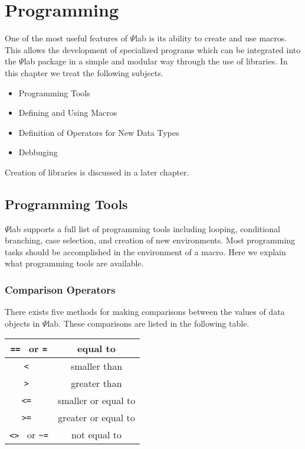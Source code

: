 \chapter{Programming}
\label{ch4}

	One of the most useful features of $\Psi$lab is its ability
to create and use macros.  This allows the development of specialized
programs which can be integrated into the $\Psi$lab package in a simple and
modular way through the use of libraries.  In this chapter we 
treat the following subjects.
\begin{itemize}
	\item Programming Tools
	\item Defining and Using Macros
        \item Definition of Operators for New Data Types
	\item{Debbuging}
\end{itemize}	
Creation of libraries is discussed in a later chapter.

\section{Programming Tools}

	$\Psi$lab supports a full list of programming tools
including looping, conditional branching, case selection,
and creation of new environments.  Most programming tasks
should be accomplished in the environment of a macro.
Here we explain what programming tools are available.

\subsection{Comparison Operators}
There exists five methods for making comparisons between the
values of data objects in $\Psi$lab. These comparisons are listed
in the following table.

\begin{center}
\begin{tabular}{|c|c|}
\hline
{\tt == } or {\tt =} & equal to \\ \hline
{\tt < } & smaller than \\ \hline
{\tt > } &  greater than \\ \hline
{\tt <= } & smaller or equal to \\ \hline
{\tt >= } & greater or equal to \\ \hline
{\tt <> } or {\verb!~=!} & not equal to \\ \hline
\end{tabular}
\end{center}

